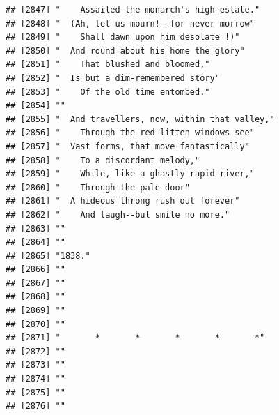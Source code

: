 \documentclass{article}\usepackage[]{graphicx}\usepackage[]{color}
\makeatletter
\newenvironment{kframe}{%
 \def\at@end@of@kframe{}%
 \ifinner\ifhmode%
  \def\at@end@of@kframe{\end{minipage}}%
  \begin{minipage}{\columnwidth}%
 \fi\fi%
 \def\FrameCommand##1{\hskip\@totalleftmargin \hskip-\fboxsep
 \colorbox{shadecolor}{##1}\hskip-\fboxsep
     \hskip-\linewidth \hskip-\@totalleftmargin \hskip\columnwidth}%
 \MakeFramed {\advance\hsize-\width
   \@totalleftmargin\z@ \linewidth\hsize
   \@setminipage}}%
 {\par\unskip\endMakeFramed%
 \at@end@of@kframe}
\newenvironment{knitrout}{}{} %
\makeatother
\begin{document}
\begin{knitrout}
\begin{kframe}
\begin{verbatim}
## [2847] "    Assailed the monarch's high estate."                                     
## [2848] "  (Ah, let us mourn!--for never morrow"                                      
## [2849] "    Shall dawn upon him desolate !)"                                         
## [2850] "  And round about his home the glory"                                        
## [2851] "    That blushed and bloomed,"                                               
## [2852] "  Is but a dim-remembered story"                                             
## [2853] "    Of the old time entombed."                                               
## [2854] ""                                                                            
## [2855] "  And travellers, now, within that valley,"                                  
## [2856] "    Through the red-litten windows see"                                      
## [2857] "  Vast forms, that move fantastically"                                       
## [2858] "    To a discordant melody,"                                                 
## [2859] "    While, like a ghastly rapid river,"                                      
## [2860] "    Through the pale door"                                                   
## [2861] "  A hideous throng rush out forever"                                         
## [2862] "    And laugh--but smile no more."                                           
## [2863] ""                                                                            
## [2864] ""                                                                            
## [2865] "1838."                                                                       
## [2866] ""                                                                            
## [2867] ""                                                                            
## [2868] ""                                                                            
## [2869] ""                                                                            
## [2870] ""                                                                            
## [2871] "       *       *       *       *       *"                                    
## [2872] ""                                                                            
## [2873] ""                                                                            
## [2874] ""                                                                            
## [2875] ""                                                                            
## [2876] ""                                                                            

\end{verbatim}
\end{kframe}
\end{knitrout}
\end{document}
